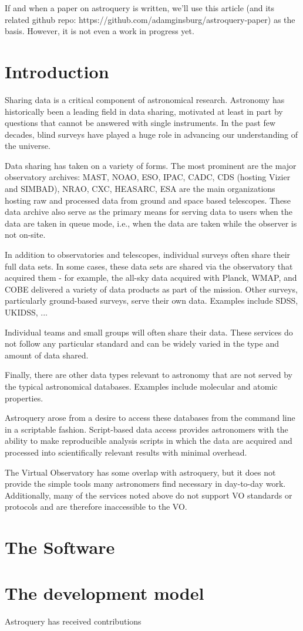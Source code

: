 If and when a paper on astroquery is written, we'll use this article (and its
related github repo: https://github.com/adamginsburg/astroquery-paper) as the
basis.  However, it is not even a work in progress yet.

\section{Introduction}
Sharing data is a critical component of astronomical research.  Astronomy
has historically been a leading field in data sharing, motivated at least
in part by questions that cannot be answered with single instruments.
In the past few decades, blind surveys have played a huge role in advancing our
understanding of the universe.

Data sharing has taken on a variety of forms.  The most prominent are the major
observatory archives: MAST, NOAO, ESO, IPAC, CADC, CDS (hosting Vizier and
SIMBAD), NRAO, CXC, HEASARC, ESA are the main
organizations hosting raw and processed data from ground and space based
telescopes.  These data archive also serve as the primary means for serving data
to users when the data are taken in queue mode, i.e., when the data are taken
while the observer is not on-site.

In addition to observatories and telescopes, individual surveys often share
their full data sets.  In some cases, these data sets are shared via the
observatory that acquired them - for example, the all-sky data acquired with
Planck, WMAP, and COBE delivered a variety of data products as part of the
mission.  Other surveys, particularly ground-based surveys, serve their own
data.  Examples include SDSS, UKIDSS, ...

Individual teams and small groups will often share their data.
These services do not follow any particular standard and can be widely
varied in the type and amount of data shared.

Finally, there are other data types relevant to astronomy that are not
served by the typical astronomical databases.  Examples include molecular
and atomic properties.

Astroquery arose from a desire to access these databases from the command line
in a scriptable fashion.  Script-based data access provides astronomers with
the ability to make reproducible analysis scripts in which the data are
acquired and processed into scientifically relevant results with minimal
overhead.

The Virtual Observatory has some overlap with astroquery, but it does not
provide the simple tools many astronomers find necessary in day-to-day work.
Additionally, many of the services noted above do not support VO standards or
protocols and are therefore inaccessible to the VO.


\section{The Software}

\section{The development model}
Astroquery has received contributions 
